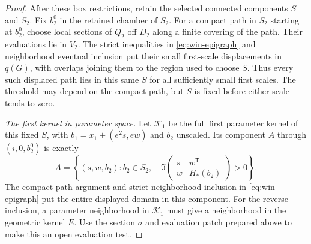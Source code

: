 \begin{proof}
After these box restrictions, retain the selected connected components $S$ and $S_2$.  Fix $b_2^0$ in the retained chamber of $S_2$.  For a compact path in $S_2$ starting at $b_2^0$, choose local sections of $Q_2$ off $D_2$ along a finite covering of the path.  Their evaluations lie in $V_2$.  The strict inequalities in \eqref{eq:win-epigraph} and neighborhood eventual inclusion put their small first-scale displacements in $q(G)$, with overlaps joining them to the region used to choose $S$.  Thus every such displaced path lies in this same $S$ for all sufficiently small first scales.  The threshold may depend on the compact path, but $S$ is fixed before either scale tends to zero.

\emph{The first kernel in parameter space.} Let $\mathcal{K}_1$ be the full first parameter kernel of this fixed $S$, with $b_1=x_1+(e^2s,ew)$ and $b_2$ unscaled.  Its component $A$ through $(i,0,b_2^0)$ is exactly
\begin{equation}\label{eq:win-first-parameter-kernel}
 A=\left\{(s,w,b_2):b_2\in S_2,\quad
       \Im\begin{pmatrix}s&w^{\mathsf T}\\w&H_*(b_2)\end{pmatrix}>0\right\}.
\end{equation}
The compact-path argument and strict neighborhood inclusion in \eqref{eq:win-epigraph} put the entire displayed domain in this component.  For the reverse inclusion, a parameter neighborhood in $\mathcal{K}_1$ must give a neighborhood in the geometric kernel $E$. Use the section $\sigma$ and evaluation patch prepared above to make this an open evaluation test.


\end{proof}
